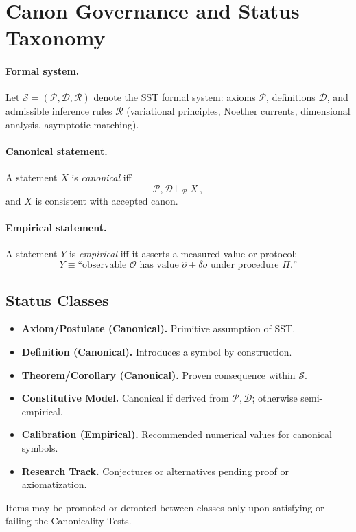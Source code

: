 \documentclass[reprint,aps,onecolumn,nofootinbib]{revtex4-2}
\begin{document}
    \section{Canon Governance and Status Taxonomy}\label{canon58:governance}
        \paragraph{Formal system.}
            Let $\mathcal{S}=(\mathcal{P},\mathcal{D},\mathcal{R})$ denote the SST formal system: axioms $\mathcal{P}$, definitions $\mathcal{D}$, and admissible inference rules $\mathcal{R}$ (variational principles, Noether currents, dimensional analysis, asymptotic matching).
        \paragraph{Canonical statement.}
            A statement $X$ is \emph{canonical} iff
            \[
                \mathcal{P},\mathcal{D}\vdash_{\mathcal{R}} X\,,
            \]
            and $X$ is consistent with accepted canon. %
        \paragraph{Empirical statement.}
            A statement $Y$ is \emph{empirical} iff it asserts a measured value or protocol:
            \[
                Y \equiv \text{``observable $\mathcal{O}$ has value $\hat{o}\pm\delta o$ under procedure $\Pi$.''}
            \]
    \subsection*{Status Classes}
    \begin{itemize}
    \item \textbf{Axiom/Postulate (Canonical).} Primitive assumption of SST.
    \item \textbf{Definition (Canonical).} Introduces a symbol by construction.
    \item \textbf{Theorem/Corollary (Canonical).} Proven consequence within $\mathcal{S}$.
    \item \textbf{Constitutive Model.} Canonical if derived from $\mathcal{P},\mathcal{D}$; otherwise semi-empirical.
    \item \textbf{Calibration (Empirical).} Recommended numerical values for canonical symbols.
    \item \textbf{Research Track.} Conjectures or alternatives pending proof or axiomatization.
    \end{itemize}
    Items may be promoted or demoted between classes only upon satisfying or failing the Canonicality Tests.
\end{document}
